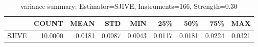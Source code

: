 \begin{table}[ht]
\centering
\caption{variance summary: Estimator=SJIVE, Instruments=166, Strength=0.30}
\begin{tabular}{lrrrrrrrr}
\toprule
 & COUNT & MEAN & STD & MIN & 25\% & 50\% & 75\% & MAX \\
\midrule
SJIVE & 10.0000 & 0.0181 & 0.0087 & 0.0043 & 0.0117 & 0.0181 & 0.0224 & 0.0321 \\
\bottomrule
\end{tabular}
\end{table}
